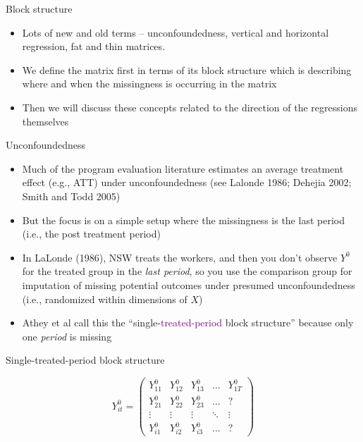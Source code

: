 \documentclass{beamer}
\begin{document}
\begin{frame}{Block structure}

\begin{itemize}
\item Lots of new and old terms -- unconfoundedness, vertical and horizontal regression, fat and thin matrices.  
\item We define the matrix first in terms of its block structure which is describing where and when the missingness is occurring in the matrix
\item Then we will discuss these concepts related to the direction of the regressions themselves
\end{itemize}

\end{frame}

\begin{frame}{Unconfoundedness}

\begin{itemize}
\item Much of the program evaluation literature estimates an average treatment effect (e.g., ATT) under unconfoundedness (see Lalonde 1986; Dehejia 2002; Smith and Todd 2005)
\item But the focus is on a simple setup where the missingness is the last period (i.e., the post treatment period)
\item In LaLonde (1986), NSW treats the workers, and then you don't observe $Y^0$ for the treated group in the \emph{last period}, so you use the comparison group for imputation of missing potential outcomes under presumed unconfoundedness (i.e., randomized within dimensions of $X$)
\item Athey et al call this the ``single-\textcolor{purple}{treated-period} block structure'' because only one \emph{period} is missing
\end{itemize}

\end{frame}

\begin{frame}{Single-treated-period block structure}

\begin{center}
\[ Y^0_{it}  =\begin{pmatrix}
    Y^0_{11} & Y^0_{12} & Y^0_{13} & \dots  &Y^0_{1T} \\
    Y^0_{21} & Y^0_{22} & Y^0_{23} & \dots  & ? \\
    \vdots & \vdots & \vdots & \ddots & \vdots \\
    Y^0_{i1} & Y^0_{i2} & Y^0_{i3} & \dots  & ?
\end{pmatrix}\]
\end{center}

\end{frame}
\end{document}
